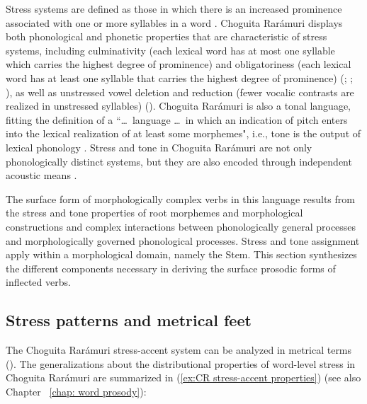 Stress systems are defined as those in which there is an increased prominence associated with one or more syllables in a word \parencite{gordonvanderhulst2018stress}. Choguita Rarámuri displays both phonological and phonetic properties that are characteristic of stress systems, including culminativity (each lexical word has at most one syllable which carries the highest degree of prominence) and obligatoriness (each lexical word has at least one syllable that carries the highest degree of prominence) (\citealt{hyman1977nature,hyman1978tone,hyman2006word}; \citealt{beckman1986stress}; \citealt{hayes1995metrical}), as well as unstressed vowel deletion and reduction (fewer vocalic contrasts are realized in unstressed syllables) (\citealt{caballero2008choguita,caballero2011morphologically}). Choguita Rarámuri is also a tonal language, fitting the definition of a “\ldots\, language \ldots\, in which an indication of pitch enters into the lexical realization of at least some morphemes", i.e., tone is the output of lexical phonology \citep[][229]{hyman2006word}. Stress and tone in Choguita Rarámuri are not only phonologically distinct systems, but they are also encoded through independent acoustic means \parencite{caballero2015tone}.

The surface form of morphologically complex verbs in this language results from the stress and tone properties of root morphemes and morphological constructions and complex interactions between phonologically general processes and morphologically governed phonological processes. Stress and tone assignment apply within a morphological domain, namely the Stem. This section synthesizes the different components necessary in deriving the surface prosodic forms of inflected verbs.

\subsection{Stress patterns and metrical feet}
\label{subsec: stress patterns and metrical feet}

The Choguita Rarámuri stress-accent system can be analyzed in metrical terms (\citealt{caballero2008choguita,caballero2011morphologically}). The generalizations about the distributional properties of word-level stress in Choguita Rarámuri are summarized in (\ref{ex:CR stress-accent properties}) (see also Chapter ~\ref{chap: word prosody}):

